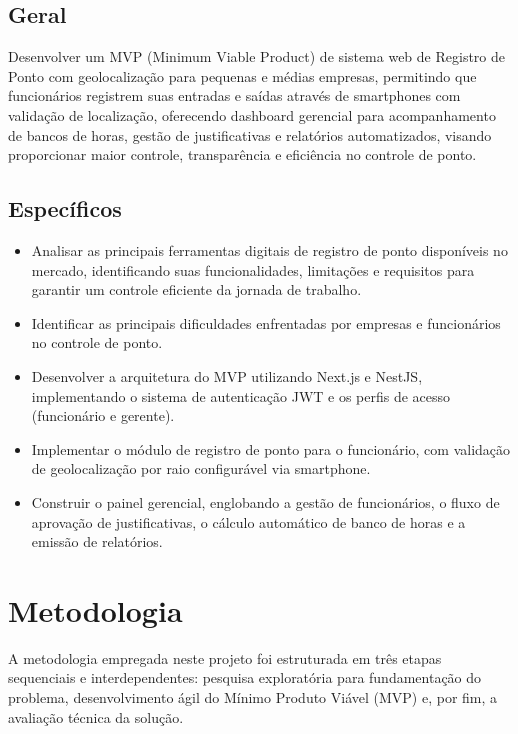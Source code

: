 \subsection{Geral}

Desenvolver um MVP (Minimum Viable Product) de sistema web de Registro de Ponto com geolocalização para pequenas e médias empresas, permitindo que funcionários registrem suas entradas e saídas através de smartphones com validação de localização, oferecendo dashboard gerencial para acompanhamento de bancos de horas, gestão de justificativas e relatórios automatizados, visando proporcionar maior controle, transparência e eficiência no controle de ponto.

\subsection{Específicos}
\begin{itemize}
    \item Analisar as principais ferramentas digitais de registro de ponto disponíveis no mercado, identificando suas funcionalidades, limitações e requisitos para garantir um controle eficiente da jornada de trabalho.
    \item Identificar as principais dificuldades enfrentadas por empresas e funcionários no controle de ponto.
    \item Desenvolver a arquitetura do MVP utilizando Next.js e NestJS, implementando o sistema de autenticação JWT e os perfis de acesso (funcionário e gerente).
    \item Implementar o módulo de registro de ponto para o funcionário, com validação de geolocalização por raio configurável via smartphone.
    \item Construir o painel gerencial, englobando a gestão de funcionários, o fluxo de aprovação de justificativas, o cálculo automático de banco de horas e a emissão de relatórios.
\end{itemize}

\section{Metodologia}
A metodologia empregada neste projeto foi estruturada em três etapas sequenciais e interdependentes: pesquisa exploratória para fundamentação do problema, desenvolvimento ágil do Mínimo Produto Viável (MVP) e, por fim, a avaliação técnica da solução.

